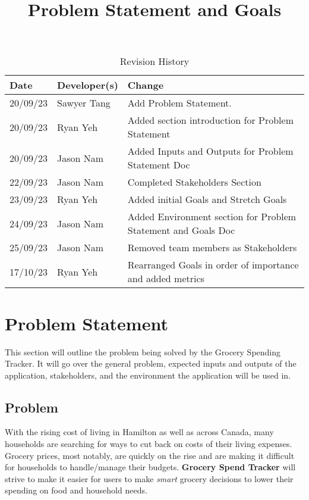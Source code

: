 \documentclass{article}
\title{Problem Statement and Goals\\\progname}
\author{\authname}
\date{}
\begin{document}
\maketitle

\begin{table}[hp]
\caption{Revision History} \label{TblRevisionHistory}
\begin{tabularx}{\textwidth}{llX}
\toprule
\textbf{Date} & \textbf{Developer(s)} & \textbf{Change}\\
\midrule
20/09/23 & Sawyer Tang & Add Problem Statement.\\
20/09/23 & Ryan Yeh & Added section introduction for Problem Statement\\
20/09/23 & Jason Nam & Added Inputs and Outputs for Problem Statement Doc\\
22/09/23 & Jason Nam & Completed Stakeholders Section\\
23/09/23 & Ryan Yeh & Added initial Goals and Stretch Goals\\
24/09/23 & Jason Nam & Added Environment section for Problem Statement and Goals Doc\\
25/09/23 & Jason Nam & Removed team members as Stakeholders\\
17/10/23 & Ryan Yeh & Rearranged Goals in order of importance and added metrics\\
\bottomrule
\end{tabularx}
\end{table}

\section{Problem Statement}


This section will outline the problem being solved by the Grocery Spending Tracker. It will go
over the general problem, expected inputs and outputs of the application, stakeholders, and the environment
the application will be used in.

\subsection{Problem}

With the rising cost of living in Hamilton as well as across Canada, many households are searching for ways to cut back on costs of their living expenses. Grocery prices, most notably, are quickly on the rise and are making it difficult for households to handle/manage their budgets. \textbf{Grocery Spend Tracker} will strive to make it easier for users to make \textit{smart} grocery decisions to lower their spending on food and household needs.
\end{document}
